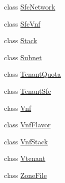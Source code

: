 \begin{DoxyCompactItemize}
\item 
class \mbox{\hyperlink{classcom_1_1example_1_1demo_1_1modular_1_1_sfc_network}{Sfc\+Network}}
\item 
class \mbox{\hyperlink{classcom_1_1example_1_1demo_1_1modular_1_1_sfc_vnf}{Sfc\+Vnf}}
\item 
class \mbox{\hyperlink{classcom_1_1example_1_1demo_1_1modular_1_1_stack}{Stack}}
\item 
class \mbox{\hyperlink{classcom_1_1example_1_1demo_1_1modular_1_1_subnet}{Subnet}}
\item 
class \mbox{\hyperlink{classcom_1_1example_1_1demo_1_1modular_1_1_tenant_quota}{Tenant\+Quota}}
\item 
class \mbox{\hyperlink{classcom_1_1example_1_1demo_1_1modular_1_1_tenant_sfc}{Tenant\+Sfc}}
\item 
class \mbox{\hyperlink{classcom_1_1example_1_1demo_1_1modular_1_1_vnf}{Vnf}}
\item 
class \mbox{\hyperlink{classcom_1_1example_1_1demo_1_1modular_1_1_vnf_flavor}{Vnf\+Flavor}}
\item 
class \mbox{\hyperlink{classcom_1_1example_1_1demo_1_1modular_1_1_vnf_stack}{Vnf\+Stack}}
\item 
class \mbox{\hyperlink{classcom_1_1example_1_1demo_1_1modular_1_1_vtenant}{Vtenant}}
\item 
class \mbox{\hyperlink{classcom_1_1example_1_1demo_1_1modular_1_1_zone_file}{Zone\+File}}
\end{DoxyCompactItemize}
